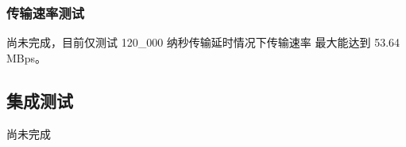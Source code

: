     \subsubsection{传输速率测试}

    尚未完成，目前仅测试 120\_000 纳秒传输延时情况下传输速率
    最大能达到 53.64 MBps。

    \subsection{集成测试}

    尚未完成